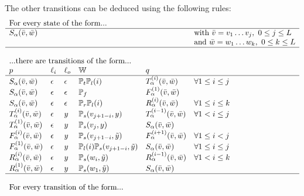 \documentclass[english]{article}
\begin{document}
The other transitions can be deduced using the following rules:
\[
\begin{array}{llllll}
  \multicolumn{6}{l}{
    \text{For every state of the form...}
  } \\
\hline
\symstate{\block}(\seqpast,\seqnext) & & & & & \text{with $\seqpast = \seqpastsyms{1}{j},\ 0 \leq j \leq \contextlen$} \\
& & & & & \text{and $\seqnext = \seqnextsyms{1}{k},\ 0 \leq k \leq \contextlen$} \\
\hline
\\
%
\multicolumn{6}{l}{
  \text{...there are transitions of the form...}
} \\
\src & \inlab & \outlab & \weight & \dest \\
\hline
\symstate{\block}(\seqpast,\seqnext) & \emptystring & \emptystring & \ptandup \lendist(i) & \tanstate{\block}{i}(\seqpast,\seqnext) & \forall 1 \leq i \leq j \\
\symstate{\block}(\seqpast,\seqnext) & \emptystring & \emptystring & \pfwddup             & \fwdstate{\block}{1}(\seqpast,\seqnext) & \\
\symstate{\block}(\seqpast,\seqnext) & \emptystring & \emptystring & \prevdup \lendist(i) & \revstate{\block}{i}(\seqpast,\seqnext) & \forall 1 \leq i \leq k \\
%
\tanstate{\block}{i}(\seqpast,\seqnext) & \emptystring & \outsym & \psubpast{j+1-i} & \tanstate{\block}{i-1}(\seqpast,\seqnext) & \forall 1 < i \leq j \\
\tanstate{\block}{1}(\seqpast,\seqnext) & \emptystring & \outsym & \psubpast{j} & \symstate{\block}(\seqpast,\seqnext) & \\
%
\fwdstate{\block}{i}(\seqpast,\seqnext) & \emptystring & \outsym & \psubcomppast{j+1-i} & \fwdstate{\block}{i+1}(\seqpast,\seqnext) & \forall 1 \leq i < j \\
\fwdstate{\block}{1}(\seqpast,\seqnext) & \emptystring & \outsym & \lendist(i) \psubcomppast{j+1-i} & \symstate{\block}(\seqpast,\seqnext) & \forall 1 \leq i \leq j \\
%
\revstate{\block}{i}(\seqpast,\seqnext) & \emptystring & \outsym & \psubcompnext{i} & \revstate{\block}{i-1}(\seqpast,\seqnext) & \forall 1 < i \leq k \\
\revstate{\block}{1}(\seqpast,\seqnext) & \emptystring & \outsym & \psubcompnext{1} & \symstate{\block}(\seqpast,\seqnext) & \\
\hline
%
\\
\multicolumn{6}{l}{
    \text{For every transition of the form...}
}
\end{array}\]
\end{document}
